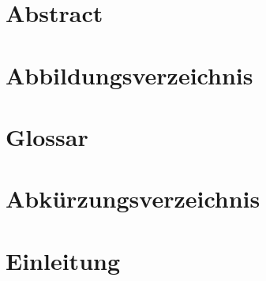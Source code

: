 \documentclass[a4paper,12pt,oneside]{article}
\begin{document}
\section*{Abstract}\label{kap_Abstract}

\newpage

\tableofcontents
\newpage
\pagestyle{fancy} %



\section*{Abbildungsverzeichnis}
\renewcommand{\listfigurename}{} %
\thispagestyle{empty}
\listoffigures
\newpage

\section*{Glossar}\label{kap_glossar}

\newpage

\section*{Abkürzungsverzeichnis}\label{kap_Abkuerzungen}

\newpage

\section{Einleitung}\label{kap_einleitung}

\newpage
\end{document}

